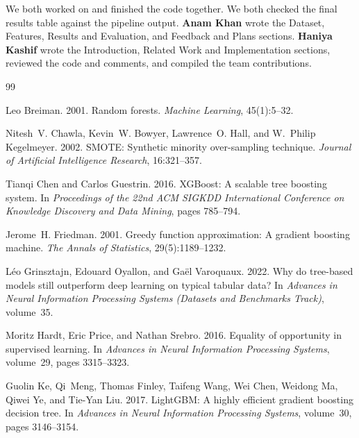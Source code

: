\documentclass[11pt]{article}
\begin{document}
We both worked on and finished the code together. We both checked the final results table against the pipeline output.
\textbf{Anam Khan} wrote the Dataset, Features, Results and Evaluation, and Feedback and Plans sections. 
\textbf{Haniya Kashif} wrote the Introduction, Related Work and Implementation sections, reviewed the code and comments, and compiled the team contributions. 

\begin{thebibliography}{99}
 
  Leo Breiman. 2001.
  \newblock Random forests.
  \newblock \emph{Machine Learning}, 45(1):5--32.
   
  Nitesh~V. Chawla, Kevin~W. Bowyer, Lawrence~O. Hall, and W.~Philip Kegelmeyer. 2002.
  \newblock SMOTE: Synthetic minority over-sampling technique.
  \newblock \emph{Journal of Artificial Intelligence Research}, 16:321--357.
   
  Tianqi Chen and Carlos Guestrin. 2016.
  \newblock XGBoost: A scalable tree boosting system.
  \newblock In \emph{Proceedings of the 22nd ACM SIGKDD International Conference on Knowledge Discovery and Data Mining}, pages 785--794.
   
  Jerome~H. Friedman. 2001.
  \newblock Greedy function approximation: A gradient boosting machine.
  \newblock \emph{The Annals of Statistics}, 29(5):1189--1232.
   
  L\'eo Grinsztajn, Edouard Oyallon, and Ga\"el Varoquaux. 2022.
  \newblock Why do tree-based models still outperform deep learning on typical tabular data?
  \newblock In \emph{Advances in Neural Information Processing Systems (Datasets and Benchmarks Track)}, volume~35.
   
  Moritz Hardt, Eric Price, and Nathan Srebro. 2016.
  \newblock Equality of opportunity in supervised learning.
  \newblock In \emph{Advances in Neural Information Processing Systems}, volume~29, pages 3315--3323.
   
  Guolin Ke, Qi~Meng, Thomas Finley, Taifeng Wang, Wei Chen, Weidong Ma, Qiwei Ye, and Tie-Yan Liu. 2017.
  \newblock LightGBM: A highly efficient gradient boosting decision tree.
  \newblock In \emph{Advances in Neural Information Processing Systems}, volume~30, pages 3146--3154.
   

\end{thebibliography}
\end{document}
